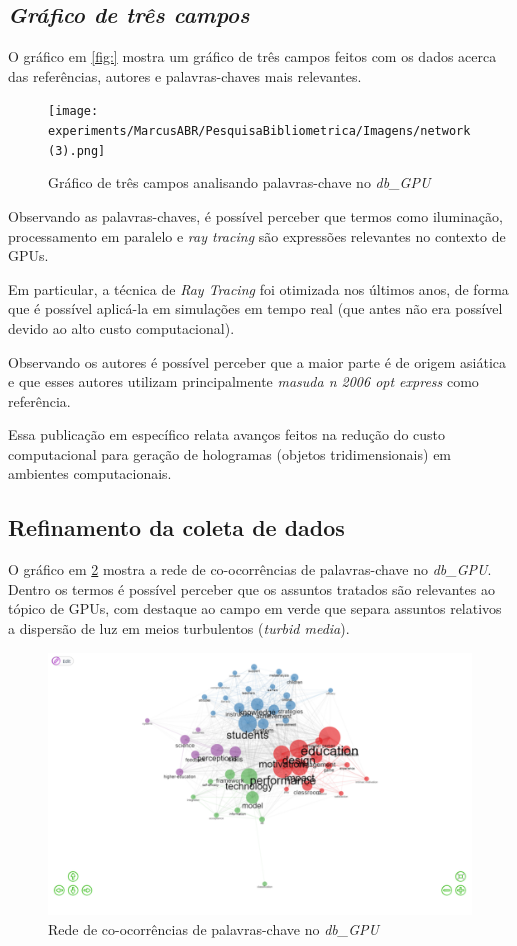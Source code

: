 \subsection{\textit{Gráfico de três campos}}

O gráfico em \ref{fig:} mostra um gráfico de três campos feitos com os dados acerca das referências, autores e palavras-chaves mais relevantes.

\begin{figure}[ht]
    \centering
    \texttt{[image: experiments/MarcusABR/PesquisaBibliometrica/Imagens/network(3).png]}
    \caption{Gráfico de três campos analisando palavras-chave no \textit{db\_GPU}}
    \label{fig:gpu-three-field}
\end{figure}

Observando as palavras-chaves, é possível perceber que termos como iluminação, processamento em paralelo e \textit{ray tracing} são expressões relevantes no contexto de GPUs.

Em particular, a técnica de \textit{Ray Tracing} foi otimizada nos últimos anos, de forma que é possível aplicá-la em simulações em tempo real (que antes não era possível devido ao alto custo computacional).

Observando os autores é possível perceber que a maior parte é de origem asiática e que esses autores utilizam principalmente \textit{masuda n 2006 opt express} como referência.

Essa publicação em específico relata avanços feitos na redução do custo computacional para geração de hologramas (objetos tridimensionais) em ambientes computacionais.

\subsection{Refinamento da coleta de dados}

O gráfico em \ref{fig:gpu-co-occur} mostra a rede de co-ocorrências de palavras-chave no \textit{db\_GPU}. Dentro os termos é possível perceber que os assuntos tratados são relevantes ao tópico de GPUs, com destaque ao campo em verde que separa assuntos relativos a dispersão de luz em meios turbulentos (\textit{turbid media}).

\begin{figure}[ht]
    \includegraphics[width=12cm]{experiments/MarcusABR/PesquisaBibliometrica/Imagens/network.png}
    \caption{Rede de co-ocorrências de palavras-chave no \textit{db\_GPU}}
    \label{fig:gpu-co-occur}
\end{figure}

